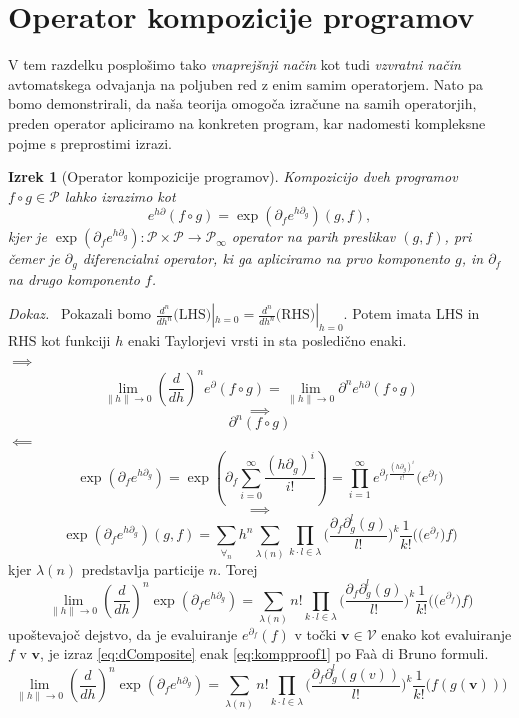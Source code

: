\documentclass[a4paper, 12pt]{book}
\newcommand{\VV}{\mathcal{V}}
\newcommand{\vv}{\mathbf{v}}
\newcommand{\dP}{\mathcal{P}}
\newcommand{\D}{\partial}
\newtheorem{izrek}{Izrek}[chapter]
\newenvironment{dokaz}{\emph{Dokaz.}\ }{\hspace{\fill}{$\Box$}}
\begin{document}
\section{Operator kompozicije programov}\label{sec:OpKompo}

V tem razdelku posplošimo tako \emph{vnaprejšnji način} \cite{PcAD} kot tudi \emph{vzvratni način} \cite{ReverseAD} avtomatskega odvajanja na poljuben red z enim samim operatorjem. Nato pa bomo demonstrirali, da naša teorija omogoča izračune na samih operatorjih, preden operator apliciramo na konkreten program, kar nadomesti kompleksne pojme s preprostimi izrazi.

 \begin{izrek}[Operator kompozicije programov]\label{izr:kompo}
 Kompozicijo dveh programov $f\circ g\in\dP$ lahko izrazimo kot
 \begin{equation}\label{eq:kompo}
 e^{h\D}(f\circ g)=\exp(\D_fe^{h\D_g})(g,f),
 \end{equation}
 kjer je $\exp(\D_fe^{h\D_g}):\dP\times\dP\to\dP_\infty$ operator na parih preslikav $(g,f)$, pri čemer je $\D_g$ diferencialni operator, ki ga apliciramo na prvo komponento $g$, in $\D_f$ na drugo komponento $f$. 
 \end{izrek}
\begin{dokaz}
  Pokazali bomo $\frac{d^n}{dh^n}\text{(LHS)}|_{h=0}=\frac{d^n}{dh^n}\text{(RHS)}|_{h=0}$. Potem imata $\text{LHS}$ in $\text{RHS}$ kot funkciji $h$ enaki Taylorjevi vrsti in sta posledično enaki.\\
 $\implies$
 $$\lim\limits_{\lVert h\rVert\to 0}(\frac{d}{dh})^ne^\D(f\circ g)=\lim\limits_{\lVert h\rVert\to 0}\D^ne^{h\D}(f\circ g)$$
 $$\implies$$
 \begin{equation}\label{eq:kompproof1}
 \D^n(f\circ g)
 \end{equation}
 $\impliedby$
 $$\exp(\D_fe^{h\D_g})=\exp\left(\D_f\sum\limits_{i=0}^{\infty}\frac{(h\D_g)^i}{i!}\right)=\prod_{i=1}^{\infty}e^{\D_f\frac{(h\D_g)^i}{i!}}\Big(e^{\D_f}\Big)$$
 $$\implies$$
 $$\exp(\D_fe^{h\D_g})(g,f)=\sum\limits_{\forall_n}h^n\sum\limits_{\lambda(n)}\prod\limits_{k\cdot l\in\lambda}\Big(\frac{\D_f\D_g^l(g)}{l!}\Big)^k\frac{1}{k!}\Big(\Big(e^{\D_f}\Big)f\Big)$$
 kjer $\lambda(n)$ predstavlja particije $n$. Torej
 \begin{equation}\label{eq:dComposite}
 \lim\limits_{\lVert h\rVert\to 0}(\frac{d}{dh})^n\exp(\D_fe^{h\D_g})=\sum\limits_{\lambda(n)}n!\prod\limits_{k\cdot l\in\lambda}\Big(\frac{\D_f\D_g^l(g)}{l!}\Big)^k\frac{1}{k!}\Big(\Big(e^{\D_f}\Big)f\Big)
 \end{equation}
 upoštevajoč dejstvo, da je evaluiranje $e^{\D_f}(f)$ v točki $\vv\in \VV$ enako kot evaluiranje $f$ v $\vv$, je izraz \eqref{eq:dComposite} enak \eqref{eq:kompproof1} po Faà di Bruno formuli.
   \begin{equation}\label{eq:dCompositePoint}
   \lim\limits_{\lVert h\rVert\to 0}(\frac{d}{dh})^n\exp(\D_fe^{h\D_g})=\sum\limits_{\lambda(n)}n!\prod\limits_{k\cdot l\in\lambda}\Big(\frac{\D_f\D_g^l(g(v))}{l!}\Big)^k\frac{1}{k!}\Big(f(g(\vv))\Big)
   \end{equation}
 \end{dokaz}  
 
\end{document}
